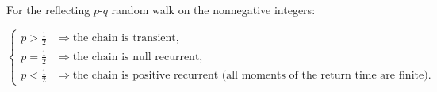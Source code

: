 For the reflecting $p$-$q$ random walk on the nonnegative integers:

\[
\begin{cases}
p > \frac{1}{2} & \Longrightarrow \text{the chain is transient}, \\[4pt]
p = \frac{1}{2} & \Longrightarrow \text{the chain is null recurrent}, \\[4pt]
p < \frac{1}{2} & \Longrightarrow \text{the chain is positive recurrent (all moments of the return time are finite)}.
\end{cases}
\]

